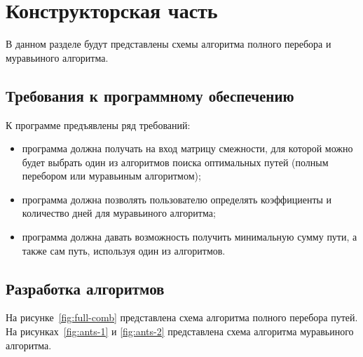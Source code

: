 \chapter{Конструкторская часть}

В данном разделе будут представлены схемы алгоритма полного перебора и муравьиного алгоритма.

\section{Требования к программному обеспечению}

К программе предъявлены ряд требований:

\begin{itemize}[label=---]
	\item программа должна получать на вход матрицу смежности, для которой можно будет выбрать один из алгоритмов поиска оптимальных путей (полным перебором или муравьиным алгоритмом);
	\item программа должна позволять пользователю определять коэффициенты и количество дней для муравьиного алгоритма;
	\item программа должна давать возможность получить минимальную сумму пути, а также сам путь, используя один из алгоритмов.
\end{itemize}

\section{Разработка алгоритмов}

На рисунке~\ref{fig:full-comb} представлена схема алгоритма полного перебора путей.
На рисунках~\ref{fig:ants-1} и \ref{fig:ants-2}  представлена схема алгоритма муравьиного алгоритма.

